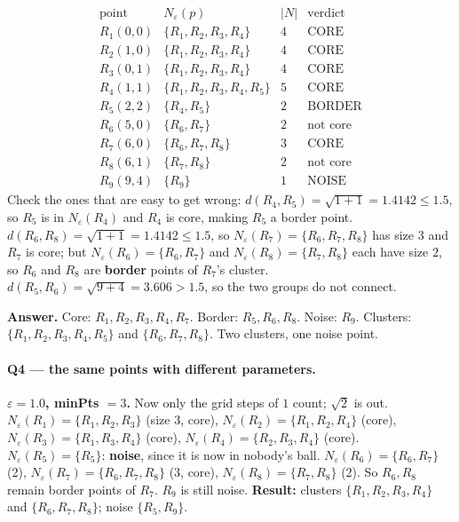 \documentclass[11pt]{article}
\begin{document}
\[
\begin{array}{llrl}
  \text{point} & N_\varepsilon(p) & |N| & \text{verdict}\\[2pt]
  R_1(0,0) & \{R_1,R_2,R_3,R_4\} & 4 & \text{CORE}\\
  R_2(1,0) & \{R_1,R_2,R_3,R_4\} & 4 & \text{CORE}\\
  R_3(0,1) & \{R_1,R_2,R_3,R_4\} & 4 & \text{CORE}\\
  R_4(1,1) & \{R_1,R_2,R_3,R_4,R_5\} & 5 & \text{CORE}\\
  R_5(2,2) & \{R_4,R_5\} & 2 & \text{BORDER}\\
  R_6(5,0) & \{R_6,R_7\} & 2 & \text{not core}\\
  R_7(6,0) & \{R_6,R_7,R_8\} & 3 & \text{CORE}\\
  R_8(6,1) & \{R_7,R_8\} & 2 & \text{not core}\\
  R_9(9,4) & \{R_9\} & 1 & \text{NOISE}
\end{array}
\]
Check the ones that are easy to get wrong: $d(R_4,R_5) = \sqrt{1+1} = 1.4142
\le 1.5$, so $R_5$ is in $N_\varepsilon(R_4)$ and $R_4$ is core, making $R_5$
a border point. $d(R_6,R_8) = \sqrt{1+1} = 1.4142 \le 1.5$, so
$N_\varepsilon(R_7) = \{R_6,R_7,R_8\}$ has size $3$ and $R_7$ is core; but
$N_\varepsilon(R_6) = \{R_6,R_7\}$ and $N_\varepsilon(R_8) = \{R_7,R_8\}$
each have size $2$, so $R_6$ and $R_8$ are \textbf{border} points of $R_7$'s
cluster. $d(R_5,R_6) = \sqrt{9+4} = 3.606 > 1.5$, so the two groups do not
connect.

\textbf{Answer.} Core: $R_1,R_2,R_3,R_4,R_7$. Border: $R_5,R_6,R_8$. Noise:
$R_9$. Clusters: $\{R_1,R_2,R_3,R_4,R_5\}$ and $\{R_6,R_7,R_8\}$. Two
clusters, one noise point.

\paragraph{Q4 --- the same points with different parameters.}
\textbf{$\varepsilon = 1.0$, minPts $= 3$.} Now only the grid steps of $1$
count; $\sqrt{2}$ is out. $N_\varepsilon(R_1) = \{R_1,R_2,R_3\}$ (size 3,
core), $N_\varepsilon(R_2) = \{R_1,R_2,R_4\}$ (core),
$N_\varepsilon(R_3) = \{R_1,R_3,R_4\}$ (core),
$N_\varepsilon(R_4) = \{R_2,R_3,R_4\}$ (core).
$N_\varepsilon(R_5) = \{R_5\}$: \textbf{noise}, since it is now in nobody's
ball. $N_\varepsilon(R_6) = \{R_6,R_7\}$ (2), $N_\varepsilon(R_7) =
\{R_6,R_7,R_8\}$ (3, core), $N_\varepsilon(R_8) = \{R_7,R_8\}$ (2). So
$R_6, R_8$ remain border points of $R_7$. $R_9$ is still noise.
\textbf{Result:} clusters $\{R_1,R_2,R_3,R_4\}$ and $\{R_6,R_7,R_8\}$; noise
$\{R_5, R_9\}$.
\end{document}
